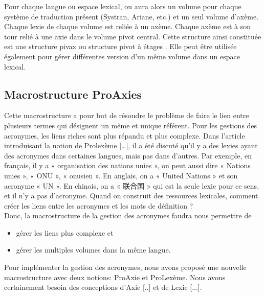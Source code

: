 \documentclass[10pt,a4paper,twoside]{article}
\newcommand{\Chinois}[1]{{\fontspec[Scale=0.9]{STSong}#1}}
\begin{document}
Pour chaque langue ou espace lexical, ou aura alors un volume pour chaque système de traduction présent (Systran, Ariane, etc.) et un seul volume d'axème. Chaque lexie de chaque volume est reliée à un axème. Chaque axème est à son tour relié à une axie dans le volume pivot central.
Cette structure ainsi constituée est une structure pivax ou structure pivot à étages \cite{MMHTN09}. Elle peut être utilisée également pour gérer différentes version d'un même volume dans un espace lexical.

\subsection{Macrostructure ProAxies}

Cette macrostructure a pour but de résoudre le problème de faire le lien entre plusieurs termes qui désignent un même et unique référent. Pour les gestions des acronymes, les liens riches sont plus répandu et plus complexe. Dans l'article introduisant la notion de Prolexème […], il a été discuté qu’il y a des lexies ayant des acronymes dans certaines langues, mais pas dans d'autres. Par exemple, en français, il y a « organisation des nations unies »\footnotemark[1], on peut aussi dire « Nations unies », « ONU », « onusien ». En anglais, on a « United Nations » et son acronyme « UN ». En chinois, on a «\Chinois{ 联合国 }» qui est la seule lexie pour ce sens, et il n’y a pas d’acronyme. Quand on construit des ressources lexicales, comment créer les liens entre les acronymes et les mots de définition ? \\
Donc, la macrostructure de la gestion des acronymes faudra nous permettre de 
\begin{itemize}
\item gérer les liens  plus complexe et
\item gérer les multiples volumes dans la même langue. 
\end{itemize}
Pour implémenter la gestion des acronymes, nous avons proposé une nouvelle macrostructure avec deux notions: ProAxie et ProLexème. Nous avons certainement besoin des conceptions d’Axie [..] et de Lexie [...]. \\
\end{document}
